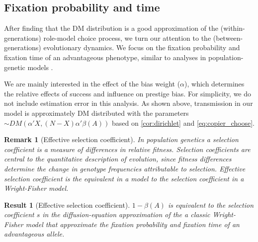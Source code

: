 \documentclass[12pt]{extarticle}
\newtheorem{remark}{Remark}
\newtheorem{result}{Result}
\begin{document}
\subsection*{Fixation probability and time}

After finding that the DM distribution is a good approximation of the (within-generations) role-model choice process, we turn our attention to the (between-generations) evolutionary dynamics.
We focus on the fixation probability and fixation time of an advantageous phenotype, similar to analyses in population-genetic models \citep{kimura,kimura_average,otto_fixation}.

We are mainly interested in the effect of the bias weight ($\alpha$), which determines the relative effects of success and influence on prestige bias.
For simplicity, we do not include estimation error in this analysis.
As shown above, transmission in our model is approximately DM distributed with the parameters $\sim DM(\alpha'X,(N-X)\alpha'\beta(A))$ based on \cref{cor:dirichlet} and \cref{eq:copier_choose}.


\begin{remark}[Effective selection coefficient]
In population genetics a selection coefficient is a measure of differences in relative fitness. Selection coefficients are central to the quantitative description of evolution, since fitness differences determine the change in genotype frequencies attributable to selection.
Effective selection coefficient is the equivalent in a model to the selection coefficient in a Wright-Fisher model.
\end{remark}

\begin{result}[Effective selection coefficient]\label{res:selection_coef}
$1-\beta(A)$ is equivalent to the selection coefficient $s$ in the diffusion-equation approximation of the a classic Wright-Fisher model that approximate the fixation probability and fixation time of an advantageous allele.
\end{result}
\end{document}
